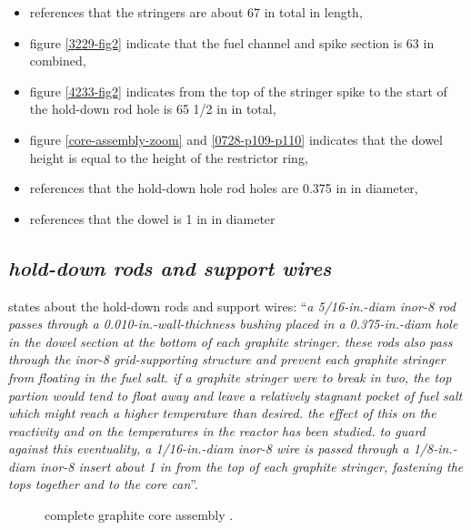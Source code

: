 \documentclass[ms,a4paper]{memoir}
\newcommand*{\mrsarchive}{../../msr-archive}%
\begin{document}
\begin{itemize}
  \item
  \textcite[page 112 and 114]{ornl-tm-3039} references that the stringers are about 67 in total in length,
  \item
  figure \ref{3229-fig2} indicate that the fuel channel and spike section is 63 in combined,
  \item
  figure \ref{4233-fig2} indicates from the top of the stringer spike to the start of the hold-down rod hole is 65 1/2 in in total,
  \item
  figure \ref{core-assembly-zoom} and \ref{0728-p109-p110} indicates that the dowel height is equal to the height of the restrictor ring,
  \item
  \parencite[page 84-85]{ornl-tm-0728} references that the hold-down hole rod holes are 0.375 in in diameter,
  \item
  \parencite[page 79 and 81]{ornl-tm-0728} references that the dowel is 1 in in diameter
\end{itemize}

\subsection{\emph{hold-down rods and support wires}}
\label{sec:hold-down-rods-support-wires}
\parencite[page 84-85]{ornl-tm-0728} states about the hold-down rods and support wires:
\enquote{\textit{a 5/16-in.-diam inor-8 rod passes through a 0.010-in.-wall-thichness bushing placed in a 0.375-in.-diam hole in the dowel section at the bottom of each graphite stringer. these rods also pass through the inor-8 grid-supporting structure and prevent each graphite stringer from floating in the fuel salt. if a graphite stringer were to break in two, the top partion would tend to float away and leave a relatively stagnant pocket of fuel salt which might reach a higher temperature than desired. the effect of this on the reactivity and on the temperatures in the reactor has been studied. to guard against this eventuality, a 1/16-in.-diam inor-8 wire is passed through a 1/8-in.-diam inor-8 insert about 1 in from the top of each graphite stringer, fastening the tops together and to the core can}}.

\begin{figure}[H]
  \centering
  \caption{complete graphite core assembly \parencite[figure 41]{ornl-3708}.}
  \label{3708-fig40}
\end{figure}
\end{document}
